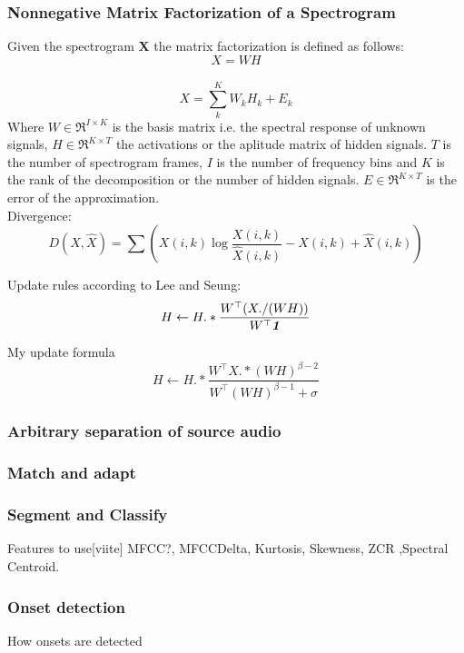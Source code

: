 \documentclass[10pt]{article}
\def\mathbi#1{\textbf{\em #1}}
\begin{document}
\subsubsection{Nonnegative Matrix Factorization of a Spectrogram}

Given the spectrogram \textbf{X} the matrix factorization is defined as follows:
\begin{equation}
{X = WH}
\end{equation}
\\
\begin{equation}
{X = \sum_k^KW_kH_k +E_k}
\end{equation}
Where $W\in \Re^{I \times K}$ is the basis matrix i.e. the spectral response of unknown signals, $H\in \Re^{K \times T}$  the activations or the aplitude matrix of hidden signals. $T$ is the number of spectrogram frames, $I$ is the number of frequency bins and $K$ is the rank of the decomposition or the number of hidden signals. $E\in \Re^{K \times T}$ is the error of the approximation.
\\
Divergence:
\begin{equation}
D(X,\hat{X})=\sum(X(i,k)\log \frac{X(i,k)}{\hat{X}(i,k)} -X(i,k)+\hat{X}(i,k))
\end{equation}

Update rules according to Lee and Seung:
\begin{equation}
H \leftarrow H.*\frac{W^\top (X./(WH))}{W^\top\mathbi{1}}
\end{equation}

My update formula
\begin{equation}
H \leftarrow H.*\frac{W^\top X.*(WH)^{\beta-2}}{W^\top (WH)^{\beta-1} +\sigma}
\end{equation}
\subsubsection{Arbitrary separation of source audio}

\subsubsection{Match and adapt }
\subsubsection{Segment and Classify}
Features to use[viite] MFCC?, MFCCDelta, Kurtosis, Skewness, ZCR ,Spectral Centroid.
\subsubsection{Onset detection}
How onsets are detected
\end{document}
